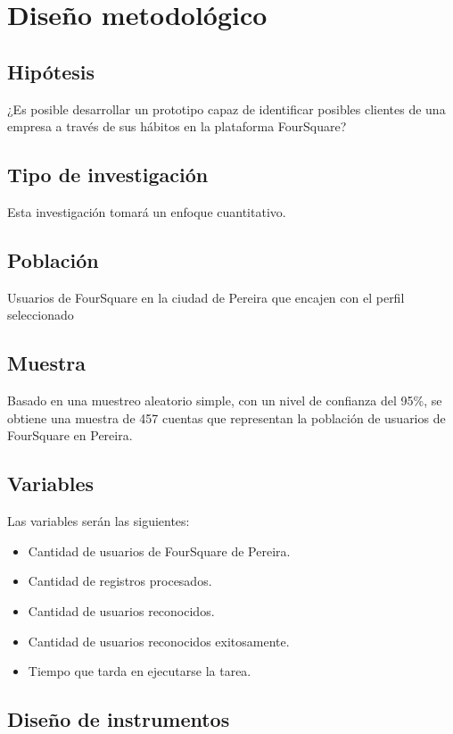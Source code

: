 \chapter{Dise\~no metodol\'ogico}
\label{sec:diseno}
\section{Hip\'otesis}
¿Es posible desarrollar un prototipo capaz de identificar posibles clientes de una empresa a trav\'es de sus h\'abitos en la plataforma FourSquare?
\section{Tipo de investigaci\'on}
Esta investigaci\'on tomar\'a un enfoque cuantitativo.
\section{Poblaci\'on}
Usuarios de FourSquare en la ciudad de Pereira que encajen con el perfil seleccionado
\section{Muestra}
Basado en una muestreo aleatorio simple, con un nivel de confianza del 95\%, se obtiene una muestra de 457 cuentas que representan la poblaci\'on de usuarios de FourSquare en Pereira.
\section{Variables}
Las variables ser\'an las siguientes:
\begin{itemize}
\item Cantidad de usuarios de FourSquare de Pereira.
\item Cantidad de registros procesados.
\item Cantidad de usuarios reconocidos.
\item Cantidad de usuarios reconocidos exitosamente.
\item Tiempo que tarda en ejecutarse la tarea.
\end{itemize}
\section{Dise\~no de instrumentos}

\pagebreak